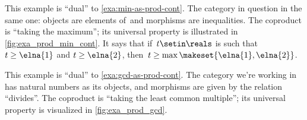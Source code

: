 \begin{figure}[h!]
    \centering
    \caption{}
    \label{fig:coprod_disunion_diagram}
\end{figure}

\begin{marginfigure}
    \centering
    \caption{Taking the maximum}
    \label{fig:exa_coprod_max_cont}
\end{marginfigure}

\begin{example}
    \label{exa:max-as-coprod}
    This example is ``dual'' to \cref{exa:min-as-prod-cont}.
    The category in question in the same one: objects are elements of~\reals and morphisms are inequalities.
    The coproduct is ``taking the maximum''; its universal property is illustrated in \cref{fig:exa_prod_min_cont}.
    It says that if~$t \setin \reals$ is such that~$t \geq \elna{1}$ and $t \geq \elna{2}$, then~$t \geq \max \makeset{ \elna{1}, \elna{2} }$.

\end{example}

\begin{marginfigure}
    \centering
    \caption{Taking the least common multiple}
    \label{fig:exa_coprod_lcm_cont}
\end{marginfigure}
\begin{example}
    \label{exa:lcm-as-coprod-cont}
    This example is ``dual'' to \cref{exa:gcd-as-prod-cont}.
    The category we're working in has natural numbers as its objects, and morphisms are given by the relation ``divides''.
    The coproduct is ``taking the least common multiple''; its universal property is visualized in \cref{fig:exa_prod_gcd}.
\end{example}

\begin{marginfigure}
    \centering
    \caption{Taking the union}
    \label{fig:exa_coprod_union_cont}
\end{marginfigure}

